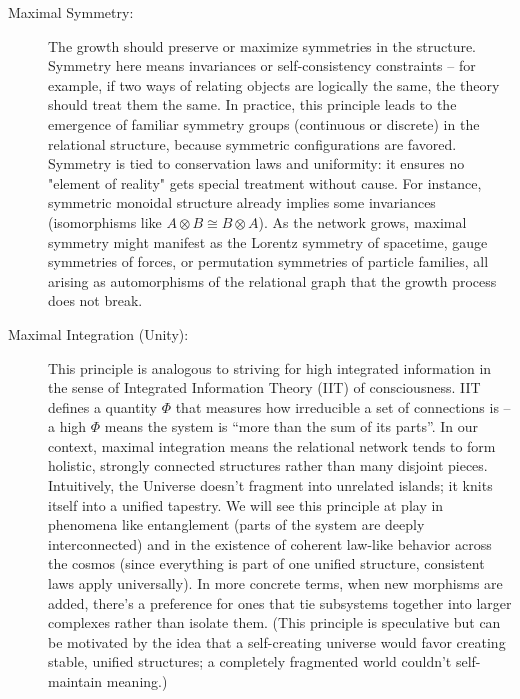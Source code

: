 \documentclass{article}
\begin{document}
\begin{description}
\item[Maximal Symmetry:] The growth should preserve or maximize symmetries in the structure. Symmetry here means invariances or self-consistency constraints – for example, if two ways of relating objects are logically the same, the theory should treat them the same. In practice, this principle leads to the emergence of familiar symmetry groups (continuous or discrete) in the relational structure, because symmetric configurations are favored. Symmetry is tied to conservation laws and uniformity: it ensures no "element of reality" gets special treatment without cause. For instance, symmetric monoidal structure already implies some invariances (isomorphisms like $A\otimes B \cong B\otimes A$). As the network grows, maximal symmetry might manifest as the Lorentz symmetry of spacetime, gauge symmetries of forces, or permutation symmetries of particle families, all arising as automorphisms of the relational graph that the growth process does not break.

\item[Maximal Integration (Unity):] This principle is analogous to striving for high integrated information in the sense of Integrated Information Theory (IIT) of consciousness. IIT defines a quantity $\Phi$ that measures how irreducible a set of connections is – a high $\Phi$ means the system is “more than the sum of its parts”\cite{oizumi2014}. In our context, maximal integration means the relational network tends to form holistic, strongly connected structures rather than many disjoint pieces. Intuitively, the Universe doesn’t fragment into unrelated islands; it knits itself into a unified tapestry. We will see this principle at play in phenomena like entanglement (parts of the system are deeply interconnected) and in the existence of coherent law-like behavior across the cosmos (since everything is part of one unified structure, consistent laws apply universally). In more concrete terms, when new morphisms are added, there’s a preference for ones that tie subsystems together into larger complexes rather than isolate them. (This principle is speculative but can be motivated by the idea that a self-creating universe would favor creating stable, unified structures; a completely fragmented world couldn’t self-maintain meaning.)


\end{description}
\end{document}

